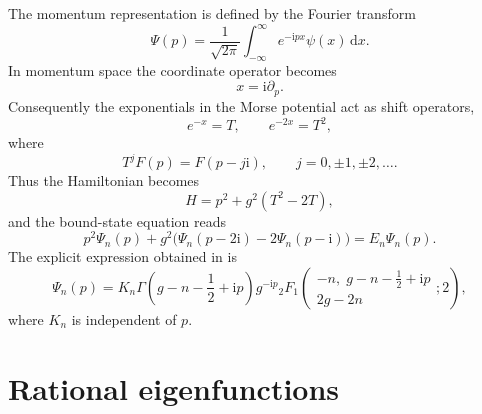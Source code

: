 \documentclass[10pt,a4paper]{amsart}
\newcommand{\ii}{\mathrm{i}}
\newcommand{\dd}{\mathrm{d}}
\numberwithin{equation}{section}
\begin{document}
The momentum representation is defined by the Fourier transform
\begin{equation}
  \Psi(p)=\frac{1}{\sqrt{2\pi}}
  \int_{-\infty}^{\infty} e^{-\ii px}\psi(x)\,\dd x.
  \label{eq:fourier}
\end{equation}
In momentum space the coordinate operator becomes
\begin{equation}
  x=\ii\partial_p.
\end{equation}
Consequently the exponentials in the Morse potential act as shift operators,
\begin{equation}
  e^{-x}=T,
  \qquad e^{-2x}=T^2,
  \label{eq:shift_exp}
\end{equation}
where
\begin{equation}
  T^jF(p)=F(p-j\ii),
  \qquad j=0,\pm1,\pm2,\dots .
  \label{eq:shift_def}
\end{equation}
Thus the Hamiltonian becomes
\begin{equation}
  H=p^2+g^2(T^2-2T),
  \label{eq:momentum_hamiltonian}
\end{equation}
and the bound-state equation reads
\begin{equation}
  p^2\Psi_n(p)+g^2\bigl(\Psi_n(p-2\ii)-2\Psi_n(p-\ii)\bigr)
  =E_n\Psi_n(p).
  \label{eq:momentum_difference_eq}
\end{equation}
The explicit expression obtained in \cite{SunDong2012} is
\begin{equation}
  \Psi_n(p)=K_n\Gamma\!\left(g-n-\frac12+\ii p\right)g^{-\ii p}
  {}_2F_1\!\left(
  \begin{matrix}
  -n,\; g-n-\frac12+\ii p\\
  2g-2n
  \end{matrix};2
  \right),
  \label{eq:sun_dong}
\end{equation}
where $K_n$ is independent of $p$.

\section{Rational eigenfunctions}\label{sec:rational}
\end{document}
